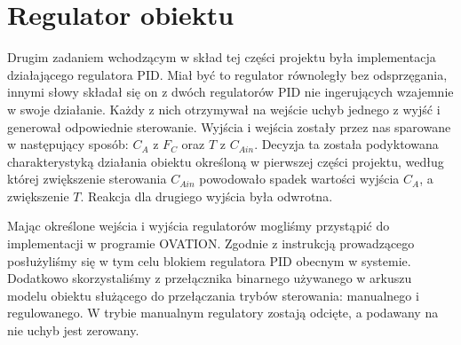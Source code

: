 \chapter{Regulator obiektu}
Drugim zadaniem wchodzącym w skład tej części projektu była implementacja działającego regulatora PID. Miał być to regulator równoległy bez odsprzęgania, innymi słowy składał się on z dwóch regulatorów PID nie ingerujących wzajemnie w swoje działanie. Każdy z nich otrzymywał na wejście uchyb jednego z wyjść i generował odpowiednie sterowanie. Wyjścia i wejścia zostały przez nas sparowane w następujący sposób: $C_A$ z $F_C$ oraz $T$ z $C_{Ain}$.
Decyzja ta została podyktowana charakterystyką działania obiektu określoną w pierwszej części projektu, według której zwiększenie sterowania $C_{Ain}$ powodowało spadek wartości wyjścia $C_A$, a zwiększenie $T$. Reakcja dla drugiego wyjścia była odwrotna.

Mając określone wejścia i wyjścia regulatorów mogliśmy przystąpić do implementacji w programie OVATION. Zgodnie z instrukcją prowadzącego posłużyliśmy się w tym celu blokiem regulatora PID obecnym w systemie. Dodatkowo skorzystaliśmy z przełącznika binarnego używanego w arkuszu modelu obiektu służącego do przełączania trybów sterowania: manualnego i regulowanego. W trybie manualnym regulatory zostają odcięte, a podawany na nie uchyb jest zerowany.

